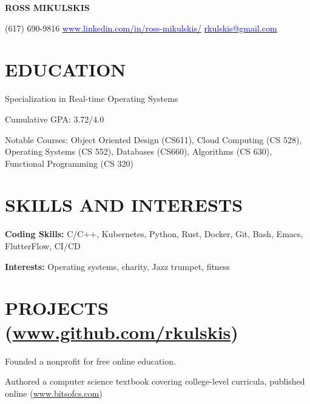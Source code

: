 \documentclass[10pt]{article}
\begin{document}
\begin{FlushLeft}

  \begin{center}
    {\bf ROSS MIKULSKIS}
  \end{center}

  (617) 690-9816 \hfill \hspace{25pt} \href{www.linkedin.com/in/ross-mikulskis/}{\textcolor{blue}{www.linkedin.com/in/ross-mikulskis/}} \hfill \href{mailto:rkulskis@gmail.com}{\textcolor{blue}{rkulskis@gmail.com}}
  \section{EDUCATION}
  \vspace{1.5em}
  \begin{itemize}{
      \item Specialization in Real-time Operating Systems
    }
  \end{itemize}
  
  \begin{itemize}{
    \item Cumulative GPA: 3.72/4.0
    \item Notable Courses: Object Oriented Design (CS611), Cloud Computing (CS 528), \\
      Operating Systems (CS 552), Databases (CS660), Algorithms (CS 630), \\
      Functional Programming (CS 320)
    }
  \end{itemize}


  \section{SKILLS AND INTERESTS}
  \vspace{-0.75em}
  \begin{itemize}{
    \item {\bf Coding Skills:} C/C++, Kubernetes, Python, Rust, Docker, Git, Bash, Emacs, FlutterFlow, CI/CD
    \item {\bf Interests:} Operating systems, charity, Jazz trumpet, fitness
    }
  \end{itemize}

  \section{PROJECTS (\href{www.github.com/rkulskis}{www.github.com/rkulskis})}
  \begin{itemize}{
    \item Founded a nonprofit for free online education.
    \item Authored a computer science textbook covering college-level curricula, published online (\href{www.bitsofcs.com}{www.bitsofcs.com})
    }
  \end{itemize}
  

\end{FlushLeft}
\end{document}
